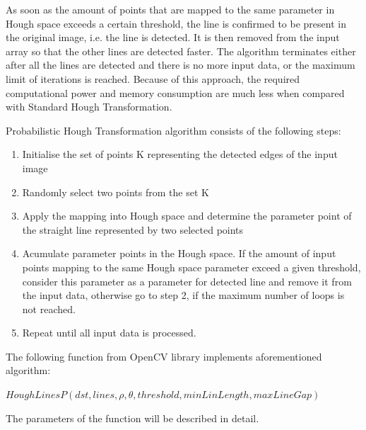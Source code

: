 As soon as the amount of points that are mapped to the same parameter in Hough space exceeds a certain threshold, the line is confirmed to be present in the original image, i.e. the line is detected. It is then removed from the input array so that the other lines are detected faster. The algorithm terminates either after all the lines are detected and there is no more input data, or the maximum limit of iterations is reached. Because of this approach, the required computational power and memory consumption are much less when compared with Standard Hough Transformation.


Probabilistic Hough Transformation algorithm consists of the following steps:

\begin{enumerate}

\item Initialise the set of points K representing the detected edges of the input image
\item  Randomly select two points from the set K  
\item  Apply the mapping into Hough space and determine the parameter point of the straight line represented by two selected points
\item  Acumulate parameter points in the Hough space. If  the amount of input points mapping to the same Hough space parameter exceed a given threshold, consider this parameter as a parameter for detected line and remove it from the input data, otherwise go to step 2, if the maximum number of loops is not reached.
\item  Repeat until all input data is processed.
\end{enumerate}

The following function from OpenCV library implements aforementioned algorithm:

  \begin{center}
  
$HoughLinesP(dst, lines, \rho, \theta, threshold, minLinLength, maxLineGap )  $

  \end{center}

The parameters of the function will be described in detail.\cite{Standard_Hough_Transformation2}
 
